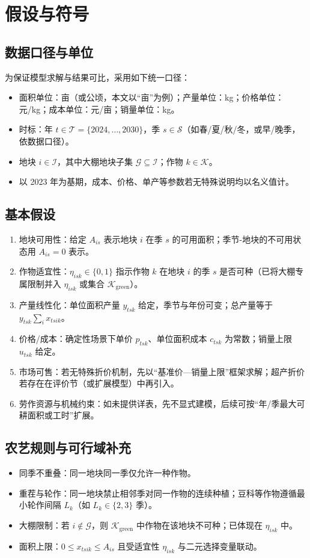 \section{假设与符号}\label{sec:assumptions}

\subsection{数据口径与单位}
为保证模型求解与结果可比，采用如下统一口径：
\begin{itemize}
  \item 面积单位：亩（或公顷，本文以“亩”为例）；产量单位：kg；价格单位：元/kg；成本单位：元/亩；销量单位：kg。
  \item 时标：年 $t\in\mathcal{T}=\{2024,\ldots,2030\}$，季 $s\in\mathcal{S}$（如春/夏/秋/冬，或早/晚季，依数据口径）。
  \item 地块 $i\in\mathcal{I}$，其中大棚地块子集 $\mathcal{G}\subseteq\mathcal{I}$；作物 $k\in\mathcal{K}$。
  \item 以 2023 年为基期，成本、价格、单产等参数若无特殊说明均以名义值计。
\end{itemize}

\subsection{基本假设}
\begin{enumerate}
  \item 地块可用性：给定 $A_{is}$ 表示地块 $i$ 在季 $s$ 的可用面积；季节-地块的不可用状态用 $A_{is}=0$ 表示。
  \item 作物适宜性：$\eta_{isk}\in\{0,1\}$ 指示作物 $k$ 在地块 $i$ 的季 $s$ 是否可种（已将大棚专属限制并入 $\eta_{isk}$ 或集合 $\mathcal{K}_{\mathrm{green}}$）。
  \item 产量线性化：单位面积产量 $y_{tsk}$ 给定，季节与年份可变；总产量等于 $y_{tsk}\sum_i x_{tsik}$。
  \item 价格/成本：确定性场景下单价 $p_{tsk}$、单位面积成本 $c_{tsk}$ 为常数；销量上限 $u_{tsk}$ 给定。
  \item 市场可售：若无特殊折价机制，先以“基准价—销量上限”框架求解；超产折价若存在在评价节（或扩展模型）中再引入。
  \item 劳作资源与机械约束：如未提供详表，先不显式建模，后续可按“年/季最大可耕面积或工时”扩展。
\end{enumerate}

\subsection{农艺规则与可行域补充}
\begin{itemize}
  \item 同季不重叠：同一地块同一季仅允许一种作物。
  \item 重茬与轮作：同一地块禁止相邻季对同一作物的连续种植；豆科等作物遵循最小轮作间隔 $L_k$（如 $L_k\in\{2,3\}$ 季）。
  \item 大棚限制：若 $i\notin\mathcal{G}$，则 $\mathcal{K}_{\mathrm{green}}$ 中作物在该地块不可种；已体现在 $\eta_{isk}$ 中。
  \item 面积上限：$0\le x_{tsik}\le A_{is}$ 且受适宜性 $\eta_{isk}$ 与二元选择变量联动。
\end{itemize}

